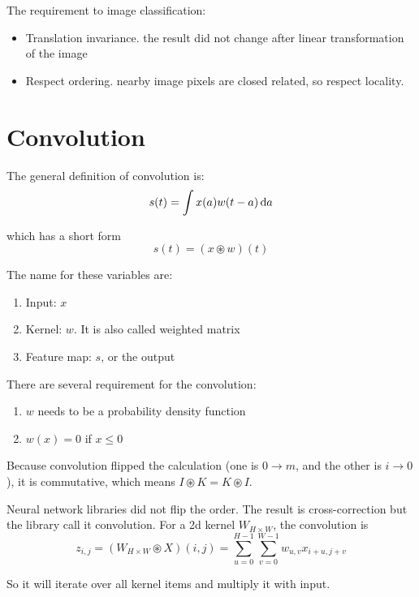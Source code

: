 The requirement to image classification:
\begin{itemize}
    \item Translation invariance. the result did not change after linear transformation of the image
    \item Respect ordering. nearby image pixels are closed related, so respect locality.
\end{itemize}


\section{Convolution}

\begin{definition}

The general definition of convolution is:
\begin{equation}
    s(t) = \int x(a) w(t-a) \dif a
\end{equation}

which has a short form
\begin{equation}
    s(t) = (x \circledast w)(t)
\end{equation}

The name for these variables are:
\begin{enumerate}
    \item Input: $x$
    \item Kernel: $w$. It is also called weighted matrix
    \item Feature map: $s$, or the output
\end{enumerate}
    
\end{definition}

There are several requirement for the convolution:
\begin{enumerate}
    \item $w$ needs to be a probability density function
    \item $w(x) = 0$ if $x \leq 0$
\end{enumerate}

Because convolution flipped the calculation (one is $0 \rightarrow m$, and the other is $i \rightarrow 0$), it is commutative, which means $I \circledast K = K \circledast I$.

\begin{definition}
    Neural network libraries did not flip the order. The result is cross-correction but the library call it convolution. For a 2d kernel $W_{H \times W}$, the convolution is
    \begin{equation}
        z_{i,j} = (W_{H \times W} \circledast X) (i,j) = \sum_{u=0}^{H-1} \sum_{v=0}^{W-1} w_{u,v} x_{i+u,j+v}
    \end{equation}
    
    So it will iterate over all kernel items and multiply it with input. 
\end{definition}

